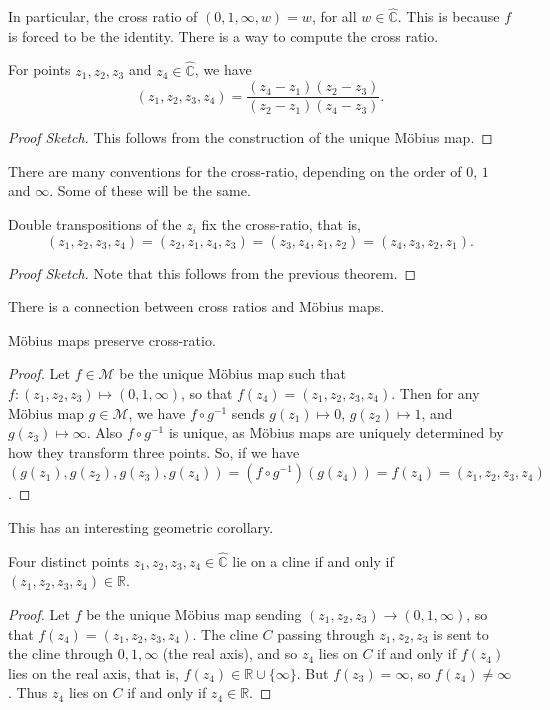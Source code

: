 \documentclass[a4paper]{scrartcl}
\begin{document}
In particular, the cross ratio of $(0, 1, \infty, w) = w$, for all $w \in \hat{\mathbb{C}}$. This is because $f$ is forced to be the identity. There is a way to compute the cross ratio.

\begin{theorem}
For points $z_1, z_2, z_3$ and $z_4 \in \hat{\mathbb{C}}$, we have
$$
(z_1, z_2 , z_3, z_4) = \frac{(z_4 - z_1)(z_2 - z_3)}{(z_2 - z_1)(z_4 - z_3)}.
$$
\end{theorem}
\begin{proof}[Proof Sketch]
This follows from the construction of the unique Möbius map.
\end{proof}

\begin{remark}
	There are many conventions for the cross-ratio, depending on the order of $0$, $1$ and $\infty$. Some of these will be the same.
\end{remark}

\begin{proposition}
	Double transpositions of the $z_i$ fix the cross-ratio, that is,
	$$
	(z_1, z_2, z_3, z_4) = (z_2, z_1, z_4, z_3) = (z_3, z_4, z_1, z_2) = (z_4, z_3, z_2, z_1).
	$$
\end{proposition}
\begin{proof}[Proof Sketch]
	Note that this follows from the previous theorem.
\end{proof}

There is a connection between cross ratios and Möbius maps.

\begin{theorem}
	Möbius maps preserve cross-ratio.
\end{theorem}
\begin{proof}
	Let $f \in \mathcal{M}$ be the unique Möbius map such that $f:(z_1, z_2, z_3) \mapsto (0, 1, \infty)$, so that $f(z_4) = (z_1, z_2, z_3, z_4)$. Then for any Möbius map $g \in \mathcal{M}$, we have $f \circ g^{-1}$ sends $g(z_1) \mapsto 0$, $g(z_2) \mapsto 1$, and $g(z_3) \mapsto \infty$. Also $f \circ g^{-1}$ is unique, as Möbius maps are uniquely determined by how they transform three points. So, if we have $(g(z_1), g(z_2), g(z_3), g(z_4)) = (f \circ g^{-1})(g(z_4)) = f(z_4) = (z_1, z_2, z_3, z_4)$.
\end{proof}

This has an interesting geometric corollary.

\begin{theorem}
	Four distinct points $z_1, z_2, z_3, z_4 \in \hat{\mathbb{C}}$ lie on a cline if and only if
	$(z_1, z_2, z_3, z_4) \in \mathbb{R}$.
\end{theorem}
\begin{proof}
	Let $f$ be the unique Möbius map sending $(z_1, z_2, z_3) \rightarrow (0, 1, \infty)$, so that $f(z_4) = (z_1, z_2, z_3, z_4)$. The cline $C$ passing through $z_1, z_2, z_3$ is sent to the cline through $0, 1, \infty$ (the real axis), and so $z_4$ lies on $C$ if and only if $f(z_4)$ lies on the real axis, that is, $f(z_4) \in \mathbb{R} \cup \{\infty\}$. But $f(z_3) = \infty$, so $f(z_4) \neq \infty$. Thus $z_4$ lies on $C$ if and only if $z_4 \in \mathbb{R}$. 
\end{proof}
\end{document}
